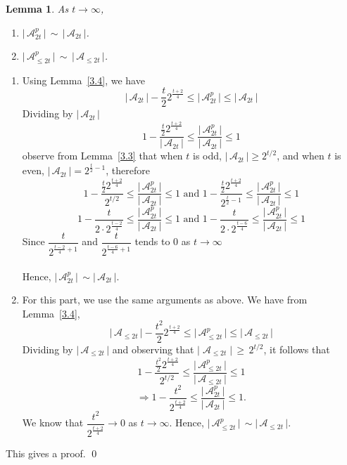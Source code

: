\documentclass[a4paper,12pt]{amsart}
\renewenvironment{proof}{{\bfseries Proof.}}{\qed}
\numberwithin{equation}{section}
\newtheorem{lemma}[theorem]{Lemma}
\theoremstyle{definition}
\newcommand{\imp}{\Rightarrow}
\newcommand{\lemref}[1]{Lemma~\ref{#1}}
\numberwithin{equation}{section}
\begin{document}
\begin{lemma}\label{3.5} As $t \to \infty$, 
   \begin{enumerate}
       \item  $ \lvert\,\mathscr{A}^p_{2t}\,\rvert\, \sim \,\lvert\,\mathscr{A}_{2t}\,\rvert$. 
       \item $ \lvert\,\mathscr{A}^p_{\leq2t}\,\rvert\, \sim \,\lvert\,\mathscr{A}_{\leq2t}\,\rvert$. 
       \end{enumerate}
\end{lemma}
\begin{proof}
    \begin{enumerate}
    \item    Using \lemref{3.4}, we have
    $$\lvert\,\mathscr{A}_{2t}\,\rvert - \frac{t}{2} 2^{\frac{t+2}{4}}\leq \lvert\,\mathscr{A}^p_{2t}\,\rvert \leq \lvert\,\mathscr{A}_{2t}\,\rvert$$ 
    Dividing by $\lvert\,\mathscr{A}_{2t}\,\rvert$ 
    $$1 - \frac{\frac{t}{2} 2^{\frac{t+2}{4}}}{\lvert\,\mathscr{A}_{2t}\,\rvert}\leq \frac{\lvert\,\mathscr{A}^p_{2t}\,\rvert}{\lvert\,\mathscr{A}_{2t}\,\rvert} \leq 1 $$
    observe from \lemref{3.3} that when $t$ is odd, $\lvert\,\mathscr{A}_{2t}\,\rvert \geq 2^{t/2}$, and when $t$ is even, $\lvert\,\mathscr{A}_{2t}\,\rvert=2^{\frac{t}{2}-1}$, therefore
     $$1 - \frac{\frac{t}{2} 2^{\frac{t+2}{4}}}{2^{t/2}}\leq \frac{\lvert\,\mathscr{A}^p_{2t}\,\rvert} {\lvert\,\mathscr{A}_{2t}\,\rvert} \leq 1 \text{ and } 1 - \frac{\frac{t}{2} 2^{\frac{t+2}{4}}}{2^{\frac{t}{2}-1}}\leq \frac{\lvert\,\mathscr{A}^p_{2t}\,\rvert} {\lvert\,\mathscr{A}_{2t}\,\rvert} \leq 1 $$
    $$1 - \frac{t}{2\cdot2^{\frac{t-2}{4}}}\leq \frac{\lvert\,\mathscr{A}^p_{2t}\,\rvert}{\lvert\,\mathscr{A}_{2t}\,\rvert} \leq 1 \text{ and } 1 - \frac{t}{2\cdot2^{\frac{t-6}{4}}}\leq \frac{\lvert\,\mathscr{A}^p_{2t}\,\rvert}{\lvert\,\mathscr{A}_{2t}\,\rvert} \leq 1$$
    Since $\dfrac{t}{2^{\frac{t-2}{4}+1}}$ and $\dfrac{t}{2^{\frac{t-6}{4}+1}}$ tends to $0$ as $t \to \infty$
    \\
    \\
    Hence,  $\lvert\,\mathscr{A}^p_{2t}\,\rvert\, \sim \lvert\,\mathscr{A}_{2t}\,\rvert.$
    \item For this part, we use the same arguments as above. We have from \lemref{3.4},
    $$\lvert\,\mathscr{A}_{\leq2t}\,\rvert - \frac{t^2}{2}2^{\frac{t+2}{4}}\leq \lvert\,\mathscr{A}^p_{\leq2t}\,\rvert \leq \lvert\,\mathscr{A}_{\leq2t}\,\rvert$$
     Dividing by $\lvert\,\mathscr{A}_{\leq2t}\,\rvert$ and observing that $\lvert \;\mathscr{A}_{\leq2t}\;\rvert\, \geq\,2^{t/2} $, it follows that
     $$1 - \dfrac{\frac{t^2}{2}2^{\frac{t+2}{4}}}{ 2^{t/2}}\leq \frac{\lvert\,\mathscr{A}^p_{\leq2t}\,\rvert}{\lvert\,\mathscr{A}_{\leq2t}\,\rvert} \leq 1 $$
     $$\imp 1 - \dfrac{t^2}{ 2^{\frac{t+2}{4}}}\leq \frac{\lvert\,\mathscr{A}^p_{2t}\,\rvert}{\lvert\,\mathscr{A}_{2t}\,\rvert} \leq 1.$$
     We know that $\dfrac{t^2}{ 2^{\frac{t+2}{4}}}\to 0$ as $t \to \infty.$ Hence,  $\lvert\,\mathscr{A}^p_{\leq2t}\,\rvert\, \sim \lvert\,\mathscr{A}_{\leq2t}\,\rvert.$
    \end{enumerate}
    This gives a proof. 
\end{proof}
\end{document}
